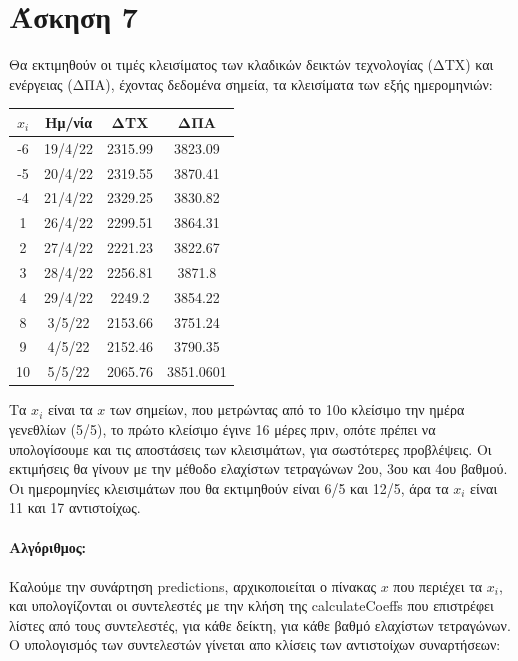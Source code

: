 \documentclass[a4paper,11pt]{article}
\newcommand{\lt}{\latintext}
\begin{document}
{\section*{Άσκηση 7}
Θα εκτιμηθούν οι τιμές κλεισίματος των κλαδικών δεικτών τεχνολογίας (ΔΤΧ) και ενέργειας (ΔΠΑ), έχοντας δεδομένα σημεία, τα κλεισίματα των εξής ημερομηνιών:
\begin{center}
    \begin{tabular}{|c|c|c|c|}
         \hline
         $x_i$& Ημ/νία & ΔΤΧ & ΔΠΑ \\
         \hline
         -6 & 19/4/22 & 2315.99 & 3823.09 \\
         \hline
         -5 &20/4/22 & 2319.55 & 3870.41 \\
         \hline
         -4 &21/4/22 & 2329.25 & 3830.82 \\
         \hline
         1 &26/4/22 & 2299.51 & 3864.31 \\
         \hline
         2 &27/4/22 & 2221.23 & 3822.67 \\
         \hline
         3 &28/4/22 & 2256.81 & 3871.8 \\
         \hline
         4 &29/4/22 & 2249.2 & 3854.22 \\
         \hline
         8 &3/5/22 & 2153.66 & 3751.24 \\
         \hline
         9 &4/5/22 & 2152.46 & 3790.35 \\
         \hline
         10 &5/5/22 & 2065.76 & 3851.0601 \\
         \hline
    \end{tabular}
\end{center}
 Τα $x_i$ είναι τα $x$ των σημείων, που μετρώντας από το 10ο κλείσιμο την ημέρα γενεθλίων (5/5), το πρώτο κλείσιμο έγινε 16 μέρες πριν, οπότε πρέπει να υπολογίσουμε και τις αποστάσεις των κλεισιμάτων, για σωστότερες προβλέψεις. Οι εκτιμήσεις θα γίνουν με την μέθοδο ελαχίστων τετραγώνων 2ου, 3ου και 4ου βαθμού. 
 Οι ημερομηνίες κλεισιμάτων που θα εκτιμηθούν είναι 6/5 και 12/5, άρα τα $x_i$ είναι 11 και 17 αντιστοίχως.\\\\
 
\textbf{Αλγόριθμος:}\\\\
Καλούμε την συνάρτηση {\lt predictions}, αρχικοποιείται ο πίνακας $x$ που περιέχει τα $x_i$, και υπολογίζονται οι συντελεστές με την κλήση της {\lt calculateCoeffs} που επιστρέφει λίστες από τους συντελεστές, για κάθε δείκτη, για κάθε βαθμό ελαχίστων τετραγώνων. Ο υπολογισμός των συντελεστών γίνεται απο κλίσεις των αντιστοίχων συναρτήσεων:

}
\end{document}
